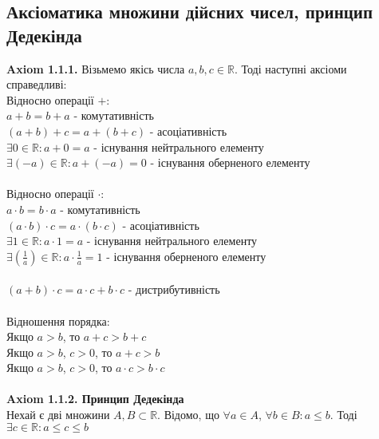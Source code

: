 \documentclass[a4paper, 14pt]{extarticle}
\def\huge{\displaystyle}
\begin{document}
	\subsection{Аксіоматика множини дійсних чисел, принцип Дедекінда}
	\textbf{Axiom 1.1.1.} Візьмемо якісь числа $a,b,c \in\mathbb{R}$. Тоді наступні аксіоми справедливі:\\
	Відносно операції $+$:\\
	$a+b=b+a$ - комутативність\\
	$(a+b)+c=a+(b+c)$ - асоціативність\\
	$\exists 0 \in\mathbb{R}: a+0=a$ - існування нейтрального елементу\\
	$\exists (-a) \in\mathbb{R}: a+(-a)=0$ - існування оберненого елементу\\
	\\
	Відносно операції $\cdot$:\\
	$a \cdot b=b \cdot a$ - комутативність\\
	$(a \cdot b) \cdot c=a \cdot (b \cdot c)$ - асоціативність\\
	$\exists 1 \in\mathbb{R}: a \cdot 1=a$ - існування нейтрального елементу\\
	$\huge \exists \left(\frac{1}{a}\right) \in\mathbb{R}: a \cdot \frac{1}{a}=1$ - існування оберненого елементу\\
	\\
	$(a+b) \cdot c = a \cdot c + b \cdot c$ - дистрибутивність\\
	\\
	Відношення порядка:\\
	Якщо $a>b$, то $a+c>b+c$\\
	Якщо $a>b$, $c>0$, то $a+c>b$\\
	Якщо $a>b$, $c>0$, то $a \cdot c>b \cdot c$\\
	\\
	\textbf{Axiom 1.1.2. Принцип Дедекінда}\\
	Нехай є дві множини $A,B \subset \mathbb{R}$. Відомо, що $\forall a \in A$, $\forall b \in B: a \leq b$. Тоді $\exists c \in \mathbb{R}: a \leq c \leq b$
	
\end{document}
